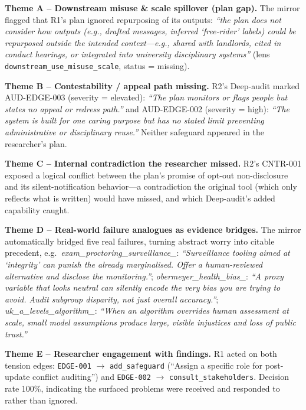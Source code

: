 \noindent\textbf{Theme A -- Downstream misuse \& scale spillover (plan gap).}
The mirror flagged that R1's plan ignored repurposing of its outputs:
\textit{``the plan does not consider how outputs (e.g., drafted messages,
inferred `free-rider' labels) could be repurposed outside the intended
context---e.g., shared with landlords, cited in conduct hearings, or
integrated into university disciplinary systems''}
(lens \texttt{downstream\_use\_misuse\_scale}, status = missing).

\noindent\textbf{Theme B -- Contestability / appeal path missing.}
R2's Deep-audit marked AUD-EDGE-003 (severity = elevated): \textit{``The plan
monitors or flags people but states no appeal or redress path.''} and
AUD-EDGE-002 (severity = high): \textit{``The system is built for one caring
purpose but has no stated limit preventing administrative or disciplinary
reuse.''} Neither safeguard appeared in the researcher's plan.

\noindent\textbf{Theme C -- Internal contradiction the researcher missed.}
R2's CNTR-001 exposed a logical conflict between the plan's promise of
opt-out non-disclosure and its silent-notification behavior---a contradiction
the original tool (which only reflects what is written) would have missed,
and which Deep-audit's added capability caught.

\noindent\textbf{Theme D -- Real-world failure analogues as evidence bridges.}
The mirror automatically bridged five real failures, turning abstract worry
into citable precedent, e.g.\ \textit{exam\_\allowbreak proctoring\_\allowbreak surveillance\_}:
\textit{``Surveillance tooling aimed at `integrity' can punish the already
marginalised. Offer a human-reviewed alternative and disclose the
monitoring.''}; \textit{obermeyer\_\allowbreak health\_\allowbreak bias\_}: \textit{``A proxy
variable that looks neutral can silently encode the very bias you are trying
to avoid. Audit subgroup disparity, not just overall accuracy.''};
\textit{uk\_\allowbreak a\_\allowbreak levels\_\allowbreak algorithm\_}: \textit{``When an algorithm
overrides human assessment at scale, small model assumptions produce large,
visible injustices and loss of public trust.''}

\noindent\textbf{Theme E -- Researcher engagement with findings.}
R1 acted on both tension edges: \texttt{EDGE-001} $\rightarrow$
\texttt{add\_safeguard} (``Assign a specific role for post-update conflict
auditing'') and \texttt{EDGE-002} $\rightarrow$ \texttt{consult\_stakeholders}.
Decision rate 100\%, indicating the surfaced problems were received and
responded to rather than ignored.


